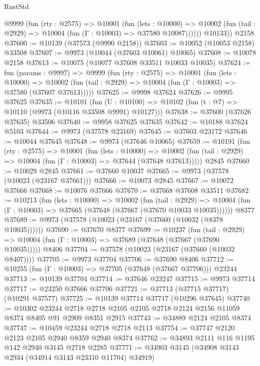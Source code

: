 \begin{lexlean}{RustStd}
\begin{coremodule}
          @9999
            (fun (rty : @2575) =>
            @10001
              (fun (lets : @10000) =>
              @10002 (fun (tail : @2929) => @10004 (fun (Γ : @10003) => @37580 @10087))))))
        @10133))
    @2158
@37600 := @10139 (@37573 (@9990 @2158))
@37603 := @10052 (@10053 @2158) @33508
@37607 := @9973 (@10044 (@37603 @10061) @10065)
@37608 := @10078 @2158
@37613 := @10075 (@10077 @37608 @33511 @10033 @10035)
@37624 := fun (params : @9997) =>
  @9999
    (fun (rty : @2575) =>
    @10001
      (fun (lets : @10000) =>
      @10002 (fun (tail : @2929) => @10004 (fun (Γ : @10003) => @37580 (@37607 @37613)))))
@37625 := @9998 @37624
@37626 := @9995 @37625
@37635 := @10101
    (fun (U : @10100) => @10102 (fun (t : @7) => @10110 (@9973 (@10116 @33508 @9991) @10127)))
@37638 := @37600 (@37626 @37635) @33506
@37640 := @9958 @37625 @37635
@37642 := @10188 @37624 @5103
@37644 := @9973 (@37578 @23169)
@37645 := @37603 @23172
@37646 := @10044 @37645
@37648 := @9973 (@37646 @10065)
@37659 := @10191
    (fun (rty : @2575) =>
    @10001
      (fun (lets : @10000) =>
      @10002 (fun (tail : @2929) => @10004 (fun (Γ : @10003) => @37644 (@37648 @37613)))))
    @2845
@37660 := @10029 @2845
@37661 := @37660 @10037
@37665 := @9973 (@37578 (@10023 (@23167 @37661)))
@37666 := @10073 @2845
@37667 := @10072 @37666
@37668 := @10076 @37666
@37670 := @37668 @37608 @33511
@37682 := @10213
    (fun (lets : @10000) =>
    @10002
      (fun (tail : @2929) =>
      @10004 (fun (Γ : @10003) => @37665 (@37648 (@37667 (@37670 @10033 @10035))))))
    @8377
@37689 := @9973 (@37578 (@10023 (@23167 (@37660 (@10032 (@8378 @10035))))))
@37690 := @37670 @8377
@37699 := @10237
    (fun (tail : @2929) => @10004 (fun (Γ : @10003) => @37689 (@37648 (@37667 (@37690 @10035)))))
    @8406
@37704 := @37578 (@10023 (@23167 (@37660 (@10032 @8407))))
@37705 := @9973 @37704
@37706 := @37690 @8406
@37712 := @10255 (fun (Γ : @10003) => @37705 (@37648 (@37667 @37706))) @23244
@37713 := @10139 @37704
@37714 := @37646 @23247
@37715 := @9973 @37714
@37717 := @23250 @37666 @37706
@37721 := @37713 (@37715 @37717) (@10291 @37577)
@37725 := @10139 @37714 @37717 (@10296 @37645)
@37740 := @10302
    @23244
    @2718
    @2718
    @2105
    @2105
    @2718
    @2124
    @2156
    @11059
    @8374
    @8405
    @91
    @2909
    @8351
    @2915
@37743 := @34889 @2124 @2105 @8374
@37747 := @10459 @23244 @2718 @2718 @2113
@37754 := @37747 @2120 @2123 @2105 @2940 @8359 @2940 @8374
@37762 := @34893 @2111 @116 @1195 @142 @2940 @3145 @2718 @2285
@37771 := @34903 @3145 (@34908 @3143 @2934 (@34914 @3143 @23310 @11704) @34919)

\end{coremodule}
\end{lexlean}

